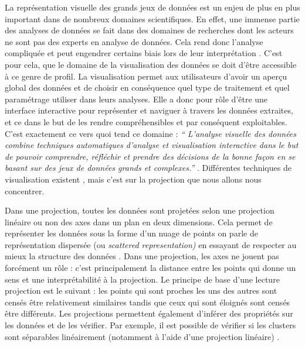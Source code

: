 
La représentation visuelle des grands jeux de données est un enjeu de plus en plus important dans de nombreux domaines scientifiques. En effet, une immense partie des analyses de données se fait dans des domaines de recherches dont les acteurs ne sont pas des experts en analyse de données. Cela rend donc l’analyse compliquée et peut engendrer certains biais lors de leur interprétation \cite{HeulotAnEvaluation}. C’est pour cela, que le domaine de la visualisation des données se doit d’être accessible à ce genre de profil.\newline
La visualisation permet aux utilisateurs d’avoir un aperçu global des données et de choisir en conséquence quel type de traitement et quel paramétrage utiliser dans leurs analyses. Elle a donc pour rôle d’être une interface interactive pour représenter et naviguer à travers les données extraites, et ce dans le but de les rendre compréhensibles et par conséquent exploitables\cite{card1999readings}. C’est exactement ce vers quoi tend ce domaine : \textit{“ L'analyse visuelle des données combine techniques automatiques d'analyse et visualisation interactive dans le but de pouvoir comprendre, réfléchir et prendre des décisions de la bonne façon en se basant sur des jeux de données grands et complexes.”} \cite{keim2008visual}. 
Différentes techniques de visualisation existent \cite{HeulotThese}, mais c’est sur la projection que nous allons nous concentrer. 
\smallskip

    Dans une projection, toutes les données sont projetées selon une projection linéaire ou non des axes dans un plan en deux dimensions. Cela permet de représenter les données sous la forme d’un nuage de points on parle de représentation dispersée (ou \textit{scattered representation)} en essayant de respecter au mieux la structure des données \cite{HeulotThese}. \newline 
    Dans une projection, les axes ne jouent pas forcément un rôle : c’est principalement la distance entre les points qui donne un sens et une interprétabilité à la projection\cite{koffka1997PsychoGesttalt}. 
    Le principe de base d'une lecture projection est le suivant : les points qui sont proches les uns des autres sont censés être relativement similaires tandis que ceux qui sont éloignés sont censés être différents. \newline 
    Les projections permettent également d’inférer des propriétés sur les données et de les vérifier. Par exemple, il est possible de vérifier si les clusters sont séparables linéairement (notamment à l’aide d’une projection linéaire) \cite{HeulotThese} .
\smallskip

